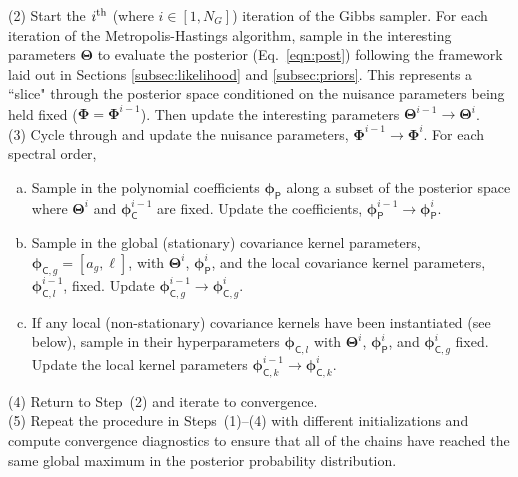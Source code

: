 \documentclass[iop,floatfix]{emulateapj}
\newcommand{\vT}{ {\bm \Theta}}
\newcommand{\vp}{ {\bm \phi}}
\newcommand{\vP}{ {\bm \Phi}}
\newcommand{\cheb}{ \vp_{\mathsf{P}}}
\newcommand{\cov}{ \vp_{\mathsf{C}}}
\begin{document}
\noindent (2) Start the $i^{\rm th}$ (where $i \in [1,N_G]$) iteration of the Gibbs sampler.  For 
each iteration of the Metropolis-Hastings algorithm, sample in the interesting parameters $\vT$ to 
evaluate the posterior (Eq.~\ref{eqn:post}) following the framework laid out in Sections 
\ref{subsec:likelihood} and \ref{subsec:priors}.  This represents a ``slice" through the posterior 
space conditioned on the nuisance parameters being held fixed ($\vP = \vP^{i-1}$).  Then update the 
interesting parameters $\vT^{i-1} \rightarrow \vT^i$. \\

\noindent (3) Cycle through and update the nuisance parameters, $\vP^{i-1} \rightarrow \vP^i$.  For 
each spectral order,   

\begin{enumerate}[(a)]
\item Sample in the polynomial coefficients $\cheb$ along a subset of the posterior space where 
$\vT^i$ and $\cov^{i-1}$ are fixed.  Update the coefficients, $\cheb^{i-1} \rightarrow \cheb^i$.  

\item Sample in the global (stationary) covariance kernel parameters, $\vp_{{\mathsf C},g} = 
[a_g, \ell]$, with $\vT^i$, $\cheb^i$, and the local covariance kernel parameters, 
$\vp_{{\mathsf C}, l}^{i-1}$, fixed.  Update $\vp_{{\mathsf C}, g}^{i-1} \rightarrow \vp_{{\mathsf 
C}, g}^i$.

\item If any local (non-stationary) covariance kernels have been instantiated (see below), sample in their hyperparameters $\vp_{{\mathsf C},l}$ with $\vT^i$, 
$\cheb^i$, and $\vp_{{\mathsf C}, g}^i$ fixed.  Update the local kernel parameters 
$\vp_{{\mathsf C}, k}^{i-1} \rightarrow \vp_{{\mathsf C}, k}^i$.  
\end{enumerate}

\noindent (4) Return to Step~(2) and iterate to convergence. \\

\noindent (5) Repeat the procedure in Steps~(1)--(4) with different initializations and compute 
convergence diagnostics to ensure that all of the chains have reached the same global maximum in 
the posterior probability distribution. \\
\end{document}
